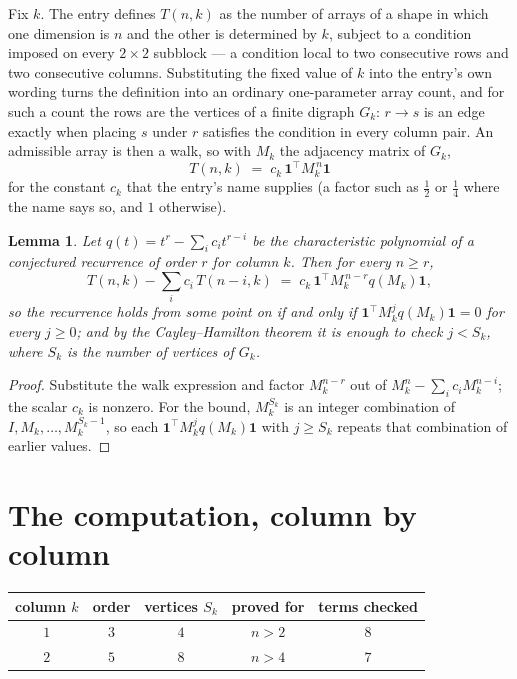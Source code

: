 \documentclass[11pt,a4paper]{article}
\theoremstyle{plain}
\newtheorem{lemma}[theorem]{Lemma}
\theoremstyle{definition}
\begin{document}
Fix $k$. The entry defines $T(n,k)$ as the number of arrays of a shape in which one dimension
is $n$ and the other is determined by $k$, subject to a condition imposed on every
$2\times2$ subblock --- a condition local to two consecutive rows and two consecutive columns.
Substituting the fixed value of $k$ into the entry's own wording turns the definition into an
ordinary one-parameter array count, and for such a count the rows are the vertices of a finite
digraph $G_k$: $r\to s$ is an edge exactly when placing $s$ under $r$ satisfies the condition
in every column pair. An admissible array is then a walk, so with $M_k$ the adjacency matrix
of $G_k$,
\[
T(n,k)\;=\;c_k\,\mathbf{1}^{\!\top}M_k^{\,n}\mathbf{1}
\]
for the constant $c_k$ that the entry's name supplies (a factor such as $\tfrac12$ or
$\tfrac14$ where the name says so, and $1$ otherwise).

\begin{lemma}\label{lem:crit}
Let $q(t)=t^{r}-\sum_i c_it^{r-i}$ be the characteristic polynomial of a conjectured
recurrence of order $r$ for column $k$. Then for every $n\ge r$,
\[
T(n,k)-\sum_i c_i\,T(n-i,k)\;=\;c_k\,\mathbf{1}^{\!\top}M_k^{\,n-r}q(M_k)\mathbf{1},
\]
so the recurrence holds from some point on if and only if
$\mathbf{1}^{\!\top}M_k^{j}q(M_k)\mathbf{1}=0$ for every $j\ge0$; and by the
Cayley--Hamilton theorem it is enough to check $j<S_k$, where $S_k$ is the number of vertices
of $G_k$.
\end{lemma}

\begin{proof}
Substitute the walk expression and factor $M_k^{n-r}$ out of $M_k^{n}-\sum_ic_iM_k^{n-i}$;
the scalar $c_k$ is nonzero. For the bound, $M_k^{S_k}$ is an integer combination of
$I,M_k,\dots,M_k^{S_k-1}$, so each $\mathbf{1}^{\!\top}M_k^{j}q(M_k)\mathbf{1}$ with
$j\ge S_k$ repeats that combination of earlier values.
\end{proof}

\section{The computation, column by column}

\begin{center}
\begin{tabular}{ccccc}
column $k$ & order & vertices $S_k$ & proved for & terms checked \\ \hline
$1$ & $3$ & $4$ & $n>2$ & $8$ \\
$2$ & $5$ & $8$ & $n>4$ & $7$ \\
\end{tabular}
\end{center}
\end{document}
